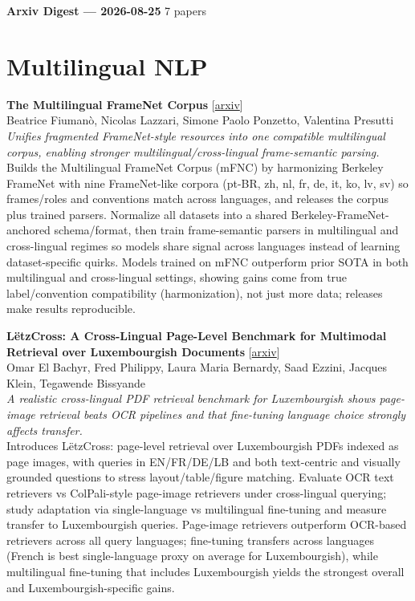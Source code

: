 \documentclass[12pt,letterpaper]{article}
\begin{document}
{\footnotesize\textbf{Arxiv Digest --- 2026-08-25} \hfill 7 papers}

\smallskip

\section*{Multilingual NLP}

{\small\textbf{The Multilingual FrameNet Corpus}} {\scriptsize[\href{https://arxiv.org/abs/2608.23037}{arxiv}]}\\
{\scriptsize Beatrice Fiuman\`o, Nicolas Lazzari, Simone Paolo Ponzetto, Valentina Presutti}\\

{\small\textit{Unifies fragmented FrameNet-style resources into one compatible multilingual corpus, enabling stronger multilingual/cross-lingual frame-semantic parsing.}}\\[1pt]
{\footnotesize Builds the Multilingual FrameNet Corpus (mFNC) by harmonizing Berkeley FrameNet with nine FrameNet-like corpora (pt-BR, zh, nl, fr, de, it, ko, lv, sv) so frames/roles and conventions match across languages, and releases the corpus plus trained parsers. Normalize all datasets into a shared Berkeley-FrameNet-anchored schema/format, then train frame-semantic parsers in multilingual and cross-lingual regimes so models share signal across languages instead of learning dataset-specific quirks. Models trained on mFNC outperform prior SOTA in both multilingual and cross-lingual settings, showing gains come from true label/convention compatibility (harmonization), not just more data; releases make results reproducible.}

\medskip

{\small\textbf{L\"etzCross: A Cross-Lingual Page-Level Benchmark for Multimodal Retrieval over Luxembourgish Documents}} {\scriptsize[\href{https://arxiv.org/abs/2608.21714}{arxiv}]}\\
{\scriptsize Omar El Bachyr, Fred Philippy, Laura Maria Bernardy, Saad Ezzini, Jacques Klein, Tegawende Bissyande}\\

{\small\textit{A realistic cross-lingual PDF retrieval benchmark for Luxembourgish shows page-image retrieval beats OCR pipelines and that fine-tuning language choice strongly affects transfer.}}\\[1pt]
{\footnotesize Introduces LëtzCross: page-level retrieval over Luxembourgish PDFs indexed as page images, with queries in EN/FR/DE/LB and both text-centric and visually grounded questions to stress layout/table/figure matching. Evaluate OCR text retrievers vs ColPali-style page-image retrievers under cross-lingual querying; study adaptation via single-language vs multilingual fine-tuning and measure transfer to Luxembourgish queries. Page-image retrievers outperform OCR-based retrievers across all query languages; fine-tuning transfers across languages (French is best single-language proxy on average for Luxembourgish), while multilingual fine-tuning that includes Luxembourgish yields the strongest overall and Luxembourgish-specific gains.}
\end{document}
